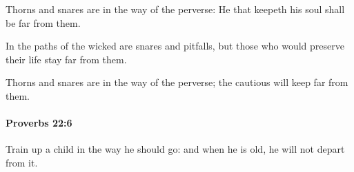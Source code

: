 			\begin{versebox}
					\item[BHS] 
					\item[ASV] Thorns and snares are in the way of the perverse: He that keepeth his soul shall be far from them.
					\item[NIV] In the paths of the wicked are snares and pitfalls, but those who would preserve their life stay far from them.
					\item[NRSV] Thorns and snares are in the way of the perverse; the cautious will keep far from them.
			\end{versebox}

		\paragraph{Proverbs 22:6} %
			\label{PROVERBS-22-6}

			Train up a child in the way he should go: and when he is old, he will not depart from it.

